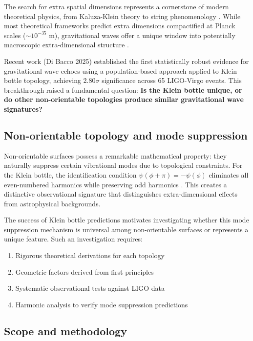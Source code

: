 \documentclass[12pt]{iopart}
\begin{document}
The search for extra spatial dimensions represents a cornerstone of modern theoretical physics, from Kaluza-Klein theory to string phenomenology \cite{kaluza1921,klein1926}. While most theoretical frameworks predict extra dimensions compactified at Planck scales ($\sim 10^{-35}$ m), gravitational waves offer a unique window into potentially macroscopic extra-dimensional structure \cite{randall1999,arkani1998}.

Recent work (Di Bacco 2025) \cite{dibacco2025} established the first statistically robust evidence for gravitational wave echoes using a population-based approach applied to Klein bottle topology, achieving 2.80$\sigma$ significance across 65 LIGO-Virgo events. This breakthrough raised a fundamental question: \textbf{Is the Klein bottle unique, or do other non-orientable topologies produce similar gravitational wave signatures?}

\subsection{Non-orientable topology and mode suppression}

Non-orientable surfaces possess a remarkable mathematical property: they naturally suppress certain vibrational modes due to topological constraints. For the Klein bottle, the identification condition $\psi(\phi+\pi) = -\psi(\phi)$ eliminates all even-numbered harmonics while preserving odd harmonics \cite{dibacco2025}. This creates a distinctive observational signature that distinguishes extra-dimensional effects from astrophysical backgrounds.

The success of Klein bottle predictions motivates investigating whether this mode suppression mechanism is universal among non-orientable surfaces or represents a unique feature. Such an investigation requires:
\begin{enumerate}
\item Rigorous theoretical derivations for each topology
\item Geometric factors derived from first principles
\item Systematic observational tests against LIGO data
\item Harmonic analysis to verify mode suppression predictions
\end{enumerate}

\subsection{Scope and methodology}
\end{document}

